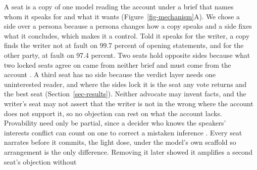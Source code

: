A seat is a copy of one model reading the account under a brief that
names whom it speaks for and what it wants
(Figure~\ref{fig-mechanism}A). %
We chose a side over a persona because a persona changes how a copy
speaks and a side fixes what it concludes, which makes it a control.
Told it speaks for the writer, a copy finds the writer not at fault on
99.7 percent of opening statements, and for the other party, at fault on
97.4
percent. %
Two seats hold opposite sides because what two locked seats agree on
came from neither brief and must come from the account
\citep{milgrom1986relying,dewatripont1999advocates}. %
A third seat has no side because the verdict layer needs one uninterested
reader, and where the sides lock it is the seat any vote returns and the
best seat (Section~\ref{sec-results}). %
Neither advocate may invent facts, and the writer's seat may not assert
that the writer is not in the wrong where the account does not support
it, so no objection can rest on what the account lacks. Provability need
only be partial, since a decider who knows the speakers' interests
conflict can count on one to correct a mistaken inference
\citep{lipman1995robust}. %
Every seat narrates before it commits, the light dose, under the model's
own scaffold so arrangement is the only
difference. %
Removing it later showed it amplifies a second seat's objection without
